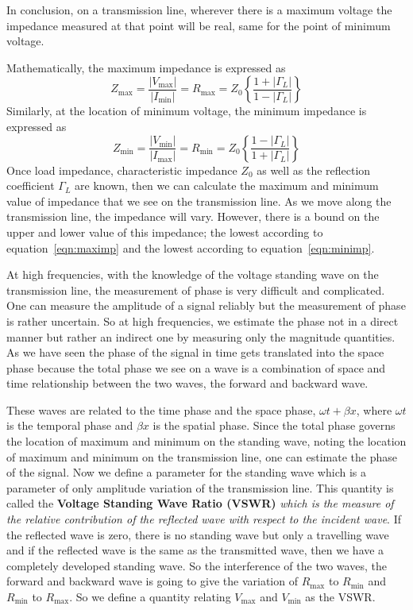 In conclusion, on a transmission line, wherever there is a maximum voltage the impedance measured at that point will be real, same for the point of minimum voltage.

Mathematically, the maximum impedance is expressed as
\begin{dmath}
Z_{\max} = \frac{|V_{\max}|}{|I_{\min}|} 
= R_{\max}
= Z_0\left\{\frac{1+|\Gamma_L|}{1-|\Gamma_L|}\right\}
\label{eqn:maximp}
\end{dmath}
Similarly, at the location of minimum voltage, the minimum impedance is expressed as
\begin{dmath}
Z_{\min}=\frac{|V_{\min}|}{|I_{\max}|} 
= R_{\min}=Z_0\left\{\frac{1-|\Gamma_L|}{1+|\Gamma_L|} \right\}
\label{eqn:minimp}
\end{dmath}
Once load impedance, characteristic impedance $Z_0$ as well as the reflection coefficient $\Gamma_L$ are known, then we can calculate the maximum and minimum value of impedance that we see on the transmission line. As we move along the transmission line, the impedance will vary. However, there is a bound on the upper and lower value of this impedance; the lowest according to equation~\ref{eqn:maximp} and the lowest according to equation~\ref{eqn:minimp}.

At high frequencies, with the knowledge of the voltage standing wave on the transmission line, the measurement of phase is very difficult and complicated. One can measure the amplitude of a signal reliably but the measurement of phase is rather uncertain. So at high frequencies, we estimate the phase not in a direct manner but rather an indirect one by measuring only the magnitude quantities. As we have seen the phase of the signal in time gets translated into the space phase because the total phase we see on a wave is a combination of space and time relationship between the two waves, the forward and backward wave. 

These waves are related to the time phase and the space phase, $\omega t + \beta x$, where $\omega t$ is the temporal phase and $\beta x$ is the spatial phase. Since the total phase governs the location of maximum and minimum on the standing wave, noting the location of maximum and minimum on the transmission line, one can estimate the phase of the signal. Now we define a parameter for the standing wave which is a parameter of only amplitude variation of the transmission line. This quantity is called the \textbf{Voltage Standing Wave Ratio (VSWR)} \emph{which is the measure of the relative contribution of the reflected wave with respect to the incident wave}. If the reflected wave is zero, there is no standing wave but only a travelling wave and if the reflected wave is the same as the transmitted wave, then we have a completely developed standing wave. So the interference of the two waves, the forward and backward wave is going to give the variation of $R_{\max}$ to $R_{\min}$ and $R_{\min}$ to $R_{\max}$. So we define a quantity relating $V_{\max}$ and $V_{\min}$ as the VSWR.

